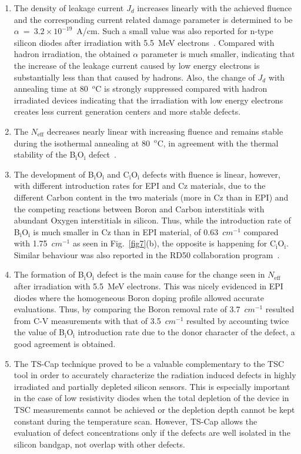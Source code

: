 \documentclass[final, 5p, times]{elsarticle}
\begin{document}
\begin{enumerate}
 \item[a)] The density of leakage current $J_d$ increases linearly with the achieved fluence and the corresponding current related damage parameter is determined to be $\alpha$~=~$3.2 \times 10^{-19}$~A/cm. Such a small value was also reported for n-type silicon diodes after irradiation with \SI{5.5}{\mega\electronvolt} electrons~\cite{b22}. Compared with hadron irradiation, the obtained $\alpha$ parameter is much smaller, indicating that the increase of the leakage current caused by low energy electrons is substantially less than that caused by hadrons. Also, the change of $J_d$ with annealing time at 80~$^o$C is strongly suppressed compared with hadron irradiated devices indicating that the irradiation with low energy electrons creates less current generation centers and more stable defects.
 \item[b)] The $N_\text{eff}$ decreases nearly linear with increasing fluence and remains stable during the isothermal annealing at 80~$^\text{o}$C, in agreement with the thermal stability of the B$_\text{i}$O$_\text{i}$ defect~\cite{b24}.
 \item[c)] The development of B$_\text{i}$O$_\text{i}$ and C$_\text{i}$O$_\text{i}$ defects with fluence is linear, however, with different introduction rates for EPI and Cz materials, due to the different Carbon content in the two materials (more in Cz than in EPI) and the competing reactions between Boron and Carbon interstitials with abundant Oxygen interstitials in silicon. Thus, while the introduction rate of B$_\text{i}$O$_\text{i}$ is much smaller in Cz than in EPI material, of 0.63~$\si{cm^{-1}}$ compared with 1.75~$\si{cm^{-1}}$ as seen in Fig.~\ref{fig7}(b), the opposite is happening for C$_\text{i}$O$_\text{i}$. Similar behaviour was also reported in the RD50 collaboration program~\cite{b9,b35}.
 \item[d)] The formation of B$_\text{i}$O$_\text{i}$ defect is the main cause for the change seen in $N_\text{eff}$ after irradiation with \SI{5.5}{\mega\electronvolt} electrons. This was nicely evidenced in EPI diodes where the homogeneous Boron doping profile allowed accurate evaluations. Thus, by comparing the Boron removal rate of 3.7~$\si{cm^{-1}}$ resulted from C-V measurements with that of 3.5~$\si{cm^{-1}}$ resulted by accounting twice the value of B$_\text{i}$O$_\text{i}$ introduction rate due to the donor character of the defect, a good agreement is obtained.
 \item[e)] The TS-Cap technique proved to be a valuable complementary to the TSC tool in order to accurately characterize the radiation induced defects in highly irradiated and partially depleted silicon sensors. This is especially important in the case of low resistivity diodes when the total depletion of the device in TSC measurements cannot be achieved or the depletion depth cannot be kept constant during the temperature scan. However, TS-Cap allows the evaluation of defect concentrations only if the defects are well isolated in the silicon bandgap, not overlap with other defects. 

\end{enumerate}
\end{document}
